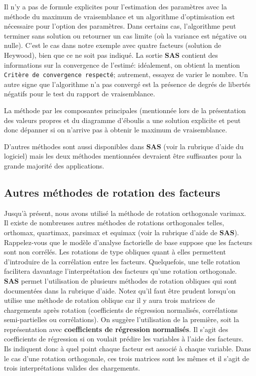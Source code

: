 \documentclass[
]{book}
\theoremstyle{definition}
\theoremstyle{definition}
\theoremstyle{definition}
\theoremstyle{remark}
\begin{document}
Il n'y a pas de formule explicites pour l'estimation des paramètres avec la méthode du maximum de vraisemblance et un algorithme d'optimisation est nécessaire pour l'option des paramètres. Dans certains cas, l'algorithme peut terminer sans solution ou retourner un cas limite (où la variance est négative ou nulle). C'est le cas dans notre exemple avec quatre facteurs (solution de Heywood), bien que ce ne soit pas indiqué. La sortie \textbf{SAS} contient des informations sur la convergence de l'estimé: idéalement, on obtient la mention \texttt{Critère\ de\ convergence\ respecté}; autrement, essayez de varier le nombre. Un autre signe que l'algorithme n'a pas convergé est la présence de degrés de libertés négatifs pour le test du rapport de vraisemblance.

La méthode par les composantes principales (mentionnée lors de la présentation des valeurs propres et du diagramme d'éboulis a une solution explicite et peut donc dépanner si on n'arrive pas à obtenir le maximum de vraisemblance.

D'autres méthodes sont aussi disponibles dans \textbf{SAS} (voir la rubrique d'aide du logiciel) mais les deux méthodes mentionnées devraient être suffisantes pour la grande majorité des applications.

\hypertarget{autres-muxe9thodes-de-rotation-des-facteurs}{%
\subsection{Autres méthodes de rotation des facteurs}\label{autres-muxe9thodes-de-rotation-des-facteurs}}

Jusqu'à présent, nous avons utilisé la méthode de rotation orthogonale varimax. Il existe de nombreuses autres méthodes de rotations orthogonales telles, orthomax, quartimax, parsimax et equimax (voir la rubrique d'aide de \textbf{SAS}). Rappelez-vous que le modèle d'analyse factorielle de base suppose que les facteurs sont non corrélés. Les rotations de type obliques quant à elles permettent d'introduire de la corrélation entre les facteurs. Quelquefois, une telle rotation facilitera davantage l'interprétation des facteurs qu'une rotation orthogonale. \textbf{SAS} permet l'utilisation de plusieurs méthodes de rotation obliques qui sont documentées dans la rubrique d'aide. Notez qu'il faut être prudent lorsqu'on utilise une méthode de rotation oblique car il y aura trois matrices de chargements après rotation (coefficients de régression normalisés, corrélations semi-partielles ou corrélations). On suggère l'utilisation de la première, soit la représentation avec \textbf{coefficients de régression normalisés}. Il s'agit des coefficients de régression si on voulait prédire les variables à l'aide des facteurs. Ils indiquent donc à quel point chaque facteur est associé à chaque variable. Dans le cas d'une rotation orthogonale, ces trois matrices sont les mêmes et il s'agit de trois interprétations valides des chargements.
\end{document}
